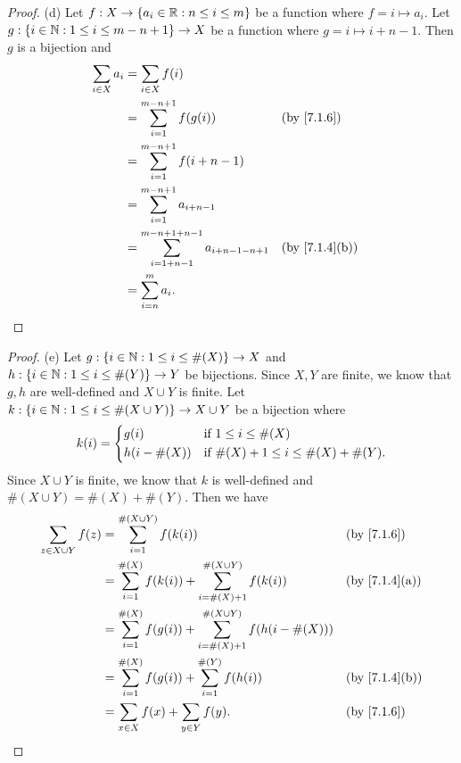\begin{proof}{(d)}
  Let \(f : X \to \left\lbrace a_i \in \mathbb{R} : n \leq i \leq m\right\rbrace\) be a function where \(f = i \mapsto a_i\).
  Let \(g : \left\lbrace i \in \mathbb{N} : 1 \leq i \leq m - n + 1\right\rbrace \to X\) be a function where \(g = i \mapsto i + n - 1\).
  Then \(g\) is a bijection and
  \begin{align*}
    \sum_{i \in X} a_i & = \sum_{i \in X} f(i)                                                               \\
                       & = \sum_{i = 1}^{m - n + 1} f(g(i))                               &  & \by{7.1.6}    \\
                       & = \sum_{i = 1}^{m - n + 1} f(i + n - 1)                                             \\
                       & = \sum_{i = 1}^{m - n + 1} a_{i + n - 1}                                            \\
                       & = \sum_{i = 1 + n - 1}^{m - n + 1 + n - 1} a_{i + n - 1 - n + 1} &  & \by{7.1.4}[b] \\
                       & = \sum_{i = n}^m a_i.
  \end{align*}
\end{proof}

\begin{proof}{(e)}
  Let \(g : \left\lbrace i \in \mathbb{N} : 1 \leq i \leq \#(X)\right\rbrace \to X\) and \(h : \left\lbrace i \in \mathbb{N} : 1 \leq i \leq \#(Y)\right\rbrace \to Y\) be bijections.
  Since \(X, Y\) are finite, we know that \(g, h\) are well-defined and \(X \cup Y\) is finite.
  Let \(k : \left\lbrace i \in \mathbb{N} : 1 \leq i \leq \#(X \cup Y)\right\rbrace \to X \cup Y\) be a bijection where
  \[
    k(i) = \begin{dcases}
      g(i)         & \text{if } 1 \leq i \leq \#(X)                  \\
      h(i - \#(X)) & \text{if } \#(X) + 1 \leq i \leq \#(X) + \#(Y).
    \end{dcases}
  \]
  Since \(X \cup Y\) is finite, we know that \(k\) is well-defined and \(\#(X \cup Y) = \#(X) + \#(Y)\).
  Then we have
  \begin{align*}
    \sum_{z \in X \cup Y} f(z) & = \sum_{i = 1}^{\#(X \cup Y)} f(k(i))                                                &  & \by{7.1.6}    \\
                               & = \sum_{i = 1}^{\#(X)} f(k(i)) + \sum_{i = \#(X) + 1}^{\#(X \cup Y)} f(k(i))         &  & \by{7.1.4}[a] \\
                               & = \sum_{i = 1}^{\#(X)} f(g(i)) + \sum_{i = \#(X) + 1}^{\#(X \cup Y)} f(h(i - \#(X)))                    \\
                               & = \sum_{i = 1}^{\#(X)} f(g(i)) + \sum_{i = 1}^{\#(Y)} f(h(i))                        &  & \by{7.1.4}[b] \\
                               & = \sum_{x \in X} f(x) + \sum_{y \in Y} f(y).                                         &  & \by{7.1.6}
  \end{align*}
\end{proof}

